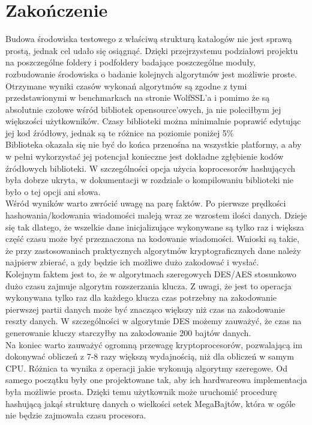 \documentclass[oneside]{mgr}
\begin{document}
\chapter{Zakończenie}
Budowa środowiska testowego z właściwą strukturą katalogów nie jest sprawą prostą, jednak cel udało się osiągnąć. Dzięki przejrzystemu podziałowi projektu na poszczególne foldery i podfoldery badające poszczególne moduły, rozbudowanie środowiska o badanie kolejnych algorytmów jest możliwie proste.\\
Otrzymane wyniki czasów wykonań algorytmów są zgodne z tymi przedstawionymi w benchmarkach na stronie WolfSSL'a i pomimo że są absolutnie czołowe wśród bibliotek opensource'owych, ja nie poleciłbym jej większości użytkowników. Czasy biblioteki można minimalnie poprawić edytując jej kod źródłowy, jednak są te różnice na poziomie poniżej 5\%\\
Biblioteka okazała się nie być do końca przenośna na wszystkie platformy, a aby w pełni wykorzystać jej potencjał konieczne jest dokładne zgłębienie kodów źródłowych biblioteki. W szczególności opcja użycia koprocesorów hashujących była dobrze ukryta, w dokumentacji w rozdziale o kompilowaniu biblioteki nie było o tej opcji ani słowa.\\
Wśród wyników warto zwrócić uwagę na parę faktów. Po pierwsze prędkości hashowania/kodowania wiadomości maleją wraz ze wzrostem ilości danych. Dzieje się tak dlatego, że wszelkie dane inicjalizujące wykonywane są tylko raz i większa część czasu może być przeznaczona na kodowanie wiadomości. Wnioski są takie, że przy zastosowaniach praktycznych algorytmów kryptograficznych dane należy najpierw zbierać, a gdy będzie ich możliwe dużo zakodować i wysłać.\\
Kolejnym faktem jest to, że w algorytmach szeregowych DES/AES stosunkowo dużo czasu zajmuje algorytm rozszerzania klucza. Z uwagi, że  jest to operacja wykonywana tylko raz dla każdego klucza czas potrzebny na zakodowanie pierwszej partii danych może być znacząco większy niż czas na zakodowanie reszty danych. W szczególności w algorytmie DES możemy zauważyć, że czas na generowanie kluczy starczyłby na zakodowanie 200 bajtów danych.\\
Na koniec warto zauważyć ogromną przewagę kryptoprocesorów, pozwalającą im dokonywać obliczeń z 7-8 razy większą wydajnością, niż dla obliczeń w samym CPU. Różnica ta wynika z operacji jakie wykonują algorytmy szeregowe. Od samego początku były one projektowane tak, aby ich hardwareowa implementacja była możliwie prosta. Dzięki temu użytkownik może uruchomić procedurę hashującą jakąś strukturę danych o wielkości setek MegaBajtów, która w ogóle nie będzie zajmowała czasu procesora.
\appendix
\end{document}
